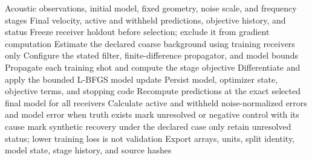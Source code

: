 \begin{algorithm}[!ht]
\caption{Frequency-continuation acoustic FWI with receiver holdout}
\label{alg:fwi-holdout}
\begin{algorithmic}[1]
\Require Acoustic observations, initial model, fixed geometry, noise scale, and frequency stages
\Ensure Final velocity, active and withheld predictions, objective history, and status
\State Freeze receiver holdout before selection; exclude it from gradient computation
\State Estimate the declared coarse background using training receivers only
  \State Configure the stated filter, finite-difference propagator, and model bounds
    \State Propagate each training shot and compute the stage objective
    \State Differentiate and apply the bounded L-BFGS model update
    \State Persist model, optimizer state, objective terms, and stopping code
  \EndFor
\EndFor
\State Recompute predictions at the exact selected final model for all receivers
\State Calculate active and withheld noise-normalized errors and model error when truth exists
  \State mark unresolved or negative control with its cause
  \State mark synthetic recovery under the declared case only
\Else
  \State retain unresolved status; lower training loss is not validation
\EndIf
\State Export arrays, units, split identity, model state, stage history, and source hashes
\end{algorithmic}
\end{algorithm}
